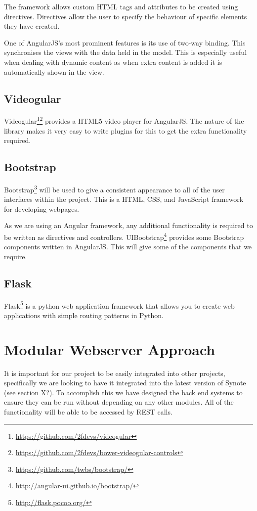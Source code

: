 The framework allows custom HTML tags and attributes to be created using directives. Directives allow the user to specify the behaviour of specific elements they have created.

One of \gls{AngularJS}'s most prominent features is its use of two-way binding. This synchronises the views with the data held in the model. This is especially useful when dealing with dynamic content as when extra content is added it is automatically shown in the view.

\subsection{Videogular}
\label{Section:Videogular}
\gls{Videogular}\footnote{\url{https://github.com/2fdevs/videogular}}\footnote{\url{https://github.com/2fdevs/bower-videogular-controls}} provides a HTML5 video player for \gls{AngularJS}. The nature of the library makes it very easy to write plugins for this to get the extra functionality required.

\subsection{Bootstrap}
\label{Section:Bootstrap}
Bootstrap\footnote{\url{https://github.com/twbs/bootstrap/}} will be used to give a consistent appearance to all of the user interfaces within the project. This is a HTML, \gls{CSS}, and JavaScript framework for developing webpages.

As we are using an Angular framework, any additional functionality is required to be written as directives and controllers. UIBootstrap\footnote{\url{http://angular-ui.github.io/bootstrap/}} provides some Bootstrap components written in \gls{AngularJS}. This will give some of the components that we require.

\subsection{Flask}
\label{Section:Flask}
Flask\footnote{\url{http://flask.pocoo.org/}} is a python web application framework that allows you to create web applications with simple routing patterns in Python.

\section{Modular Webserver Approach}
\label{Section:Modular Approach}
It is important for our project to be easily integrated into other projects, specifically we are looking to have it integrated into the latest version of Synote (see section X?). To accomplish this we have designed the back end systems to ensure they can be run without depending on any other modules. All of the functionality will be able to be accessed by \gls{REST} calls.

